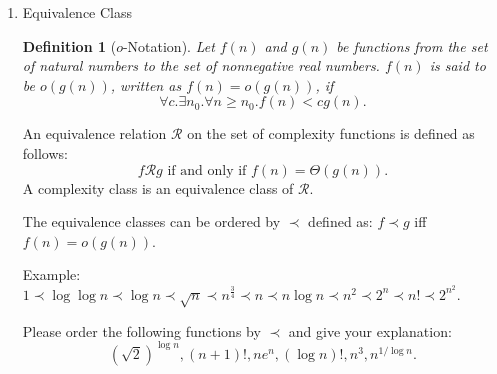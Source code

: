 \documentclass[12pt,a4paper]{article}
\newtheorem{definition}{Definition}
\theoremstyle{definition}
\begin{document}
\begin{enumerate}
\item Equivalence Class

\begin{definition}[$o$-Notation]
Let $f(n)$ and $g(n)$ be functions from the set of natural numbers to the set of nonnegative real numbers. $f(n)$ is said to be $o(g(n))$, written as $f(n)=o(g(n))$, if
$$\forall c.\exists n_{0}.\forall n\ge n_{0}.f(n)<c g(n).$$
\end{definition}

An equivalence relation $\mathcal{R}$ on the set of complexity functions is defined as follows: $$f\mathcal{R}g \mbox{ if and only if }
f(n)=\Theta(g(n)).$$ A complexity class is an equivalence class of $\mathcal{R}$.

The equivalence classes can be ordered by $\prec$ defined as: $f\prec g$ iff $f(n)=o(g(n))$.

{\color{purple}Example: $1 \prec \log \log n \prec \log n \prec \sqrt{n} \prec n^{\frac{3}{4}} \prec n \prec n \log n \prec n^2 \prec 2^n \prec n! \prec 2^{n^2}$.}

Please order the following functions by $\prec$ and give your explanation: $$(\sqrt{2})^{\log n}, (n+1)!, 
ne^n, (\log n)!, n^3,  n^{1/\log n}.$$





\end{enumerate}
\end{document}
